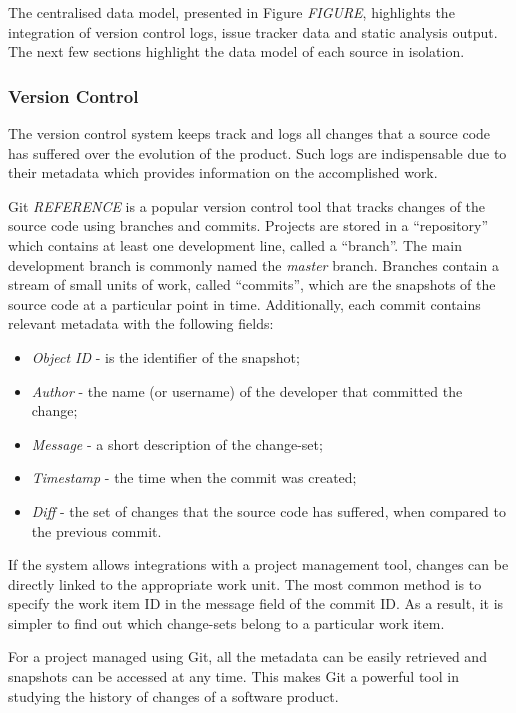 \documentclass{mpaper}
\begin{document}
The centralised data model, presented in Figure \emph{FIGURE}, highlights the
integration of version control logs, issue tracker data and static analysis
output. The next few sections highlight the data model of each source in
isolation.

\subsubsection*{Version Control}
\label{version-control}

The version control system keeps track and logs all changes that a source code
has suffered over the evolution of the product. Such logs are indispensable due
to their metadata which provides information on the accomplished work.

Git \emph{REFERENCE} is a popular version control tool that tracks changes of
the source code using branches and commits. Projects are stored in a
``repository'' which contains at least one development line, called a
``branch''. The main development branch is commonly named the \emph{master}
branch. Branches contain a stream of small units of work, called ``commits'',
which are the snapshots of the source code at a particular point in time.
Additionally, each commit contains relevant metadata with the following fields:

\begin{itemize}
  \item \emph{Object ID} - is the identifier of the snapshot;
  \item \emph{Author} - the name (or username) of the developer that committed
  the change;
  \item \emph{Message} - a short description of the change-set;
  \item \emph{Timestamp} - the time when the commit was created;
  \item \emph{Diff} - the set of changes that the source code has suffered, when
  compared to the previous commit. 
\end{itemize}

If the system allows integrations with a project management tool, changes can be
directly linked to the appropriate work unit. The most common method is to
specify the work item ID in the message field of the commit ID. As a result, it
is simpler to find out which change-sets belong to a particular work item. 

For a project managed using Git, all the metadata can be easily retrieved and
snapshots can be accessed at any time. This makes Git a powerful tool in
studying the history of changes of a software product.
\end{document}
